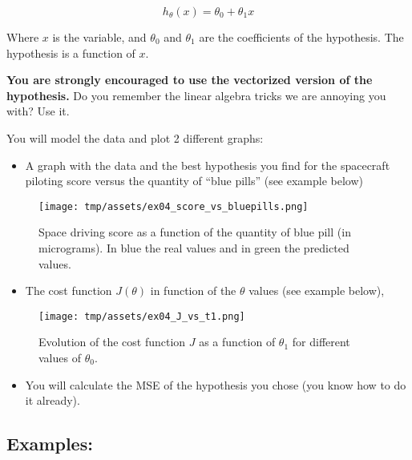 \documentclass[]{article}
\providecommand{\tightlist}{%
  \setlength{\itemsep}{0pt}\setlength{\parskip}{0pt}}
\begin{document}
\large

\[
h_{\theta}(x) = \theta_0 + \theta_1x
\] \normalsize

Where \(x\) is the variable, and \(\theta_0\) and \(\theta_1\) are the
coefficients of the hypothesis. The hypothesis is a function of \(x\).

\textbf{You are strongly encouraged to use the vectorized version of the
hypothesis.} Do you remember the linear algebra tricks we are annoying
you with? Use it.

You will model the data and plot 2 different graphs:

\begin{itemize}
\tightlist
\item
  A graph with the data and the best hypothesis you find for the
  spacecraft piloting score versus the quantity of ``blue pills'' (see
  example below)
\end{itemize}

\begin{figure}
\centering
\texttt{[image: tmp/assets/ex04\_score\_vs\_bluepills.png]}
\caption{Space driving score as a function of the quantity of blue pill
(in micrograms). In blue the real values and in green the predicted
values.}
\end{figure}

\begin{itemize}
\tightlist
\item
  The cost function \(J(\theta)\) in function of the \(\theta\) values
  (see example below),
\end{itemize}

\begin{figure}
\centering
\texttt{[image: tmp/assets/ex04\_J\_vs\_t1.png]}
\caption{Evolution of the cost function \(J\) as a function of
\(\theta_1\) for different values of \(\theta_0\).}
\end{figure}

\begin{itemize}
\tightlist
\item
  You will calculate the MSE of the hypothesis you chose (you know how
  to do it already).
\end{itemize}

\hypertarget{examples-6}{%
\subsection{Examples:}\label{examples-6}}
\end{document}
